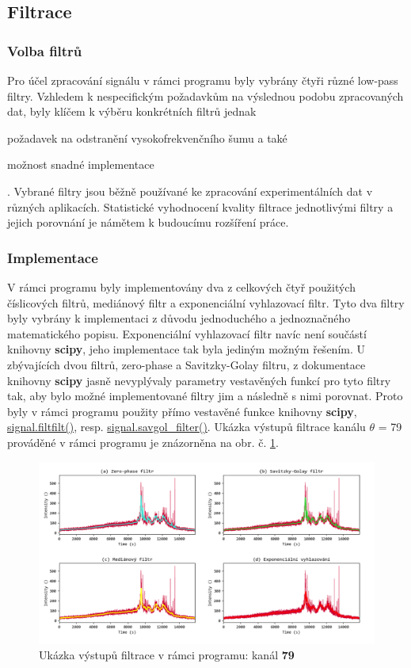 \documentclass[a4paper, 12pt]{article}
\begin{document}
\subsection{Filtrace}
\subsubsection{Volba filtrů}
Pro účel zpracování signálu v rámci programu byly vybrány čtyři různé low-pass filtry. Vzhledem k nespecifickým požadavkům na výslednou podobu zpracovaných dat, byly klíčem k výběru konkrétních filtrů jednak 
\begin{inparaenum}[($i$)]
\item požadavek na odstranění vysokofrekvenčního šumu
a také
\item možnost snadné implementace\end{inparaenum}. Vybrané filtry jsou běžně používané ke zpracování experimentálních dat v různých aplikacích. Statistické vyhodnocení kvality filtrace jednotlivými filtry a jejich porovnání je námětem k budoucímu rozšíření práce.
\subsubsection{Implementace} \label{implementace}
V rámci programu byly implementovány dva z celkových čtyř použitých číslicových filtrů, mediánový filtr a exponenciální vyhlazovací filtr. Tyto dva filtry byly vybrány k implementaci z důvodu jednoduchého a jednoznačného matematického popisu. Exponenciální vyhlazovací filtr navíc není součástí knihovny \textbf{scipy}, jeho implementace tak byla jediným možným řešením.  U zbývajících dvou filtrů, zero-phase a Savitzky-Golay filtru, z dokumentace knihovny \textbf{scipy} jasně nevyplývaly parametry vestavěných funkcí pro tyto filtry tak, aby bylo možné implementované filtry jim  a následně s nimi porovnat. Proto byly v rámci programu použity přímo vestavěné funkce knihovny \textbf{scipy}, \url{signal.filtfilt()}, resp. \url{signal.savgol_filter()}.
Ukázka výstupů filtrace kanálu $\theta$ = 79 prováděné v rámci programu je znázorněna na obr. č. \ref{fig:exp_filtry}.

\begin{figure}[hbt!]
 \centering
 \includegraphics[width=\linewidth,height=0.65\linewidth]{exp_figures.png}
 \caption{Ukázka výstupů filtrace v rámci programu: kanál \textbf{79}}
 \label{fig:exp_filtry}
\end{figure}
\end{document}
